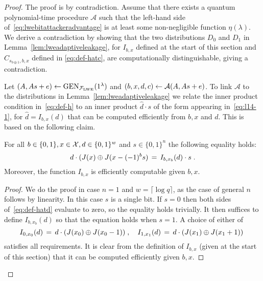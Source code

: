 \begin{proof}
The proof is by contradiction. Assume that there exists a quantum polynomial-time procedure $\mathcal{A}$ such that the left-hand side of~\eqref{eq:lwebitattackeradvantage} is at least some non-negligible function $\eta(\lambda)$. We derive a contradiction by showing that the two distributions ${D}_0$ and ${D}_1$ in Lemma~\ref{lem:lweadaptiveleakage}, for $I_{b,x}$ defined at the start of this section and $\hat{C}_{s_{b\oplus 1},b,x}$ defined in \eqref{eq:def-hatc}, are computationally distinguishable, giving a contradiction. 

Let $(\*A,\*A\*s+\*e) \leftarrow \textrm{GEN}_{\mathcal{F}_{\lwe}}(1^{\lambda})$ and $(b,x,d,c) \leftarrow \mathcal{A}(\*A,\*A\*s+\*e)$. To link $\mathcal{A}$ to the distributions in Lemma~\ref{lem:lweadaptiveleakage} we relate the inner product condition in~\eqref{eq:def-h} to an inner product $\hat{d} \cdot s$ of the form appearing in~\eqref{eq:l14-1}, for $\hat{d} = I_{b,x}(d)$ that can be computed efficiently from $b,x$ and $d$. This is based on the following claim. 

\iffalse
\begin{claim}\label{cl:dependenceonsecret}
Let $x_0,x_1\in \sX$ be such that $x_{1} = x_0 -  \*s$ for some $s \in \{0,1\}^n$. Then for any $b\in\{0,1\}$ and $d \in \{0,1\}^{w}$ the following equality holds:
\begin{equation}\label{eq:def-hatd}
d\cdot(\inj(x_0)\oplus \inj(x_1)) \,=\,  I_{b,x}(d)\cdot s \;.
\end{equation}
Moreover, the function $I_{b,x}$ is efficiently computable (given $b,x$), and $I_{b,x}(d)\neq 0^n$ whenever $d\in \hat{C}_{s,b,x}$, the set defined in~\eqref{eq:def-hatc}. 
\end{claim}
\fi

\begin{claim}\label{cl:dependenceonsecret}
For all $b\in\{0,1\},x\in \mathcal{X}, d\in\{0,1\}^w$ and $s\in\{0,1\}^n$ the following equality holds:
\begin{equation}\label{eq:def-hatd}
d\cdot(\inj(x)\oplus \inj( x - (-1)^b \*s ) \,=\,  I_{b,x_b}(d)\cdot s \;.
\end{equation}
Moreover, the function $I_{b,x}$ is efficiently computable given $b,x$. 
\end{claim}

\begin{proof}
We do the proof in case $n=1$ and $w=\lceil\log q\rceil$, as the case of general $n$ follows by linearity. In this case $s$ is a single bit. If $s=0$ then both sides of~\eqref{eq:def-hatd} evaluate to zero, so the equality holds trivially. It then suffices to define $ I_{b,x_b}(d)$ so that the equation holds when $s=1$. A choice of either of
\begin{equation}\label{eq:def-hatd-1}
I_{0,x_0}(d)\,=\, d \cdot (\inj(x_0) \oplus \inj(x_0 -\*1))\;,\quad  I_{1,x_1}(d)\,=\,d \cdot (\inj(x_1) \oplus \inj(x_1 +\*1 ))\;
\end{equation}
satisfies all requirements. It is clear from the definition of $I_{b,x}$ (given at the start of this section) that it can be computed efficiently given $b,x$.  
\end{proof}


\end{proof}
